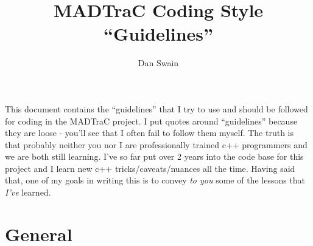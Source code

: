 \documentclass[11pt]{article}
\title{MADTraC Coding Style ``Guidelines''}
\author{Dan Swain}
\begin{document}

\maketitle

This document contains the ``guidelines'' that I try to use and should be followed for coding in the MADTraC project.  I put quotes around ``guidelines'' because they are loose - you'll see that I often fail to follow them myself.  The truth is that probably neither you nor I are professionally trained c++ programmers and we are both still learning.  I've so far put over 2 years into the code base for this project and I learn new c++ tricks/caveats/nuances all the time.  Having said that, one of my goals in writing this is to convey \textit{to you} some of the lessons that \textit{I've} learned.

\section{General}
\end{document}
